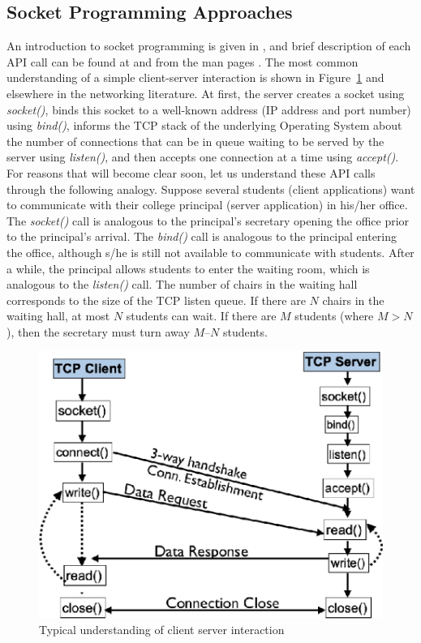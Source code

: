 \begin{multicols}{2}
\section{Socket Programming Approaches}

An introduction to socket programming is given in \cite{art1-key09}\cite{art1-key13}\cite{art1-key15}, and brief description of each API call can be found at \cite{art1-key14} and from the man pages \cite{art1-key16}.  The most common understanding of a simple client-server interaction is shown in Figure~\ref{fig01} \cite{art1-key11} and elsewhere in the networking literature. At first, the server creates a socket using \textit{socket()}, binds this socket to a well-known address (IP address and port number) using \textit{bind()}, informs the TCP stack of the underlying Operating System about the number of connections that can be in queue waiting to be served by the server using \textit{listen()}, and then accepts one connection at a time using \textit{accept()}. For reasons that will become clear soon, let us understand these API calls through the following analogy. Suppose several students (client applications) want to communicate with their college principal (server application) in his/her office. The \textit{socket()} call is analogous to the principal’s secretary opening the office prior to the principal’s arrival. The \textit{bind()} call is analogous to the principal entering the office, although s/he is still not available to communicate with students. After a while, the principal allows students to enter the waiting room, which is analogous to the \textit{listen()} call. The number of chairs in the waiting hall corresponds to the size of the TCP listen queue. If there are $N$ chairs in the waiting hall, at most $N$ students can wait. If there are $M$ students (where $M > N$), then the secretary must turn away $M – N$ students.

\begin{figure}[H]
\centering
\includegraphics[scale=2.3]{src/Figures/chap1/fig01.jpg}
\caption{Typical understanding of client server interaction}\label{fig01}


\end{figure}
\end{multicols}

